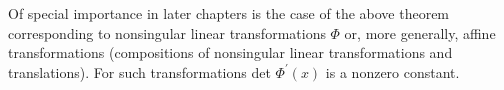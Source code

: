 Of special importance in later chapters is the case of the above theorem corresponding to 
nonsingular linear transformations $\Phi$ or, more generally, affine transformations
(compositions of nonsingular linear transformations and translations).
For such transformations det $\Phi^{\prime}(x)$ is a nonzero constant.